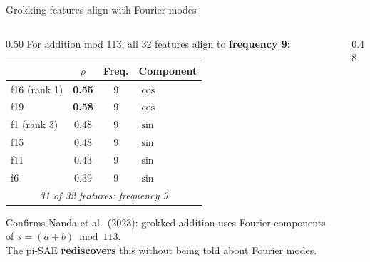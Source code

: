 \documentclass[aspectratio=169,11pt]{beamer}
\begin{document}
\begin{frame}{Grokking features align with Fourier modes}
\vspace{-0.5em}

\begin{columns}[T]
\begin{column}{0.50\textwidth}
{\small For addition mod 113, all 32 features align to \textbf{frequency 9}:}

\vspace{0.2em}
{\scriptsize\centering
\renewcommand{\arraystretch}{1.0}
\begin{tabular}{@{}lccl@{}}
\toprule
& \textbf{$\rho$} & \textbf{Freq.} & \textbf{Component} \\
\midrule
f16 (rank 1) & \textbf{0.55} & 9 & $\cos$ \\
f19           & \textbf{0.58} & 9 & $\cos$ \\
f1 (rank 3)   & 0.48 & 9 & $\sin$ \\
f15           & 0.48 & 9 & $\sin$ \\
f11           & 0.43 & 9 & $\sin$ \\
f6            & 0.39 & 9 & $\sin$ \\
\midrule
\multicolumn{4}{c}{\textit{31 of 32 features: frequency 9}} \\
\bottomrule
\end{tabular}
}

\vspace{0.3em}
{\scriptsize Confirms Nanda et al.\ (2023): grokked addition uses Fourier components of $s = (a{+}b) \bmod 113$.\\[0.2em]
The pi-SAE \textbf{rediscovers} this without being told about Fourier modes.}
\end{column}
\begin{column}{0.48\textwidth}
\centering
{}
\end{column}
\end{columns}
\end{frame}
\end{document}
